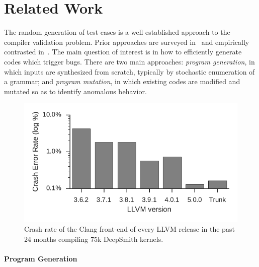 \section{Related Work}\label{sec:rw}



The random generation of test cases is a well established approach to the compiler validation problem. Prior approaches are surveyed in~\cite{Kossatchev2005,Boujarwah1997} and empirically contrasted in~\cite{Chen2014a}. The main question of interest is in how to efficiently generate codes which trigger bugs. There are two main approaches: \emph{program generation}, in which inputs are synthesized from scratch, typically by stochastic enumeration of a grammar; and \emph{program mutation}, in which existing codes are modified and mutated so as to identify anomalous behavior.

\begin{figure}
	\centering %
	\includegraphics[width=.95\columnwidth]{build/img/clang-crashes}%
	\caption{%
		Crash rate of the Clang front-end of every LLVM release in the past 24 months compiling 75k DeepSmith kernels.
	}%
	\label{fig:clangs} %
\end{figure}
\begin{table}
	\footnotesize %
	\centering %
	
	\caption{%
		The number of DeepSmith programs which trigger distinct Clang front-end assertions, and the number of programs which trigger unreachables.%
        \vspace{-2em}
	}
	\label{tab:clangs}
\end{table}

\paragraph{Program Generation}

